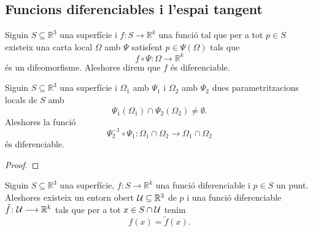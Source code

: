 \documentclass[../Apunts.tex]{subfiles}
\begin{document}
	\subsection{Funcions diferenciables i l'espai tangent}
	\begin{definition}
		\label{def:funció diferenciable}
		Siguin \(S\subseteq\mathbb{R}^{3}\) una superfície i \(f\colon S\longrightarrow\mathbb{R}^{k}\) una funció tal que per a tot \(p\in S\) existeix una carta local \(\Omega\) amb \(\Psi\) satisfent \(p\in\Psi(\Omega)\) tals que
		\[f\circ\Psi\colon\Omega\longrightarrow\mathbb{R}^{k}\]
		és un difeomorfisme. Aleshores direm que \(f\) és diferenciable.
	\end{definition}
	\begin{theorem}
		\label{thm:la composició de parametritzacions locals és una funció diferenciable}
		Siguin \(S\subseteq\mathbb{R}^{3}\) una superfície i \(\Omega_{1}\) amb \(\Psi_{1}\) i \(\Omega_{2}\) amb \(\Psi_{2}\) dues parametritzacions locals de \(S\) amb
		\[\Psi_{1}(\Omega_{1})\cap\Psi_{2}(\Omega_{2})\neq\emptyset.\]
		Aleshores la funció
		\[\Psi_{2}^{-1}\circ\Psi_{1}\colon\Omega_{1}\cap\Omega_{2}\longrightarrow\Omega_{1}\cap\Omega_{2}\]
		és diferenciable.
	\end{theorem}
	\begin{proof}
%		
	\end{proof}
	\begin{proposition}
		\label{prop:per a tot punt i funció diferenciable d'una superfície podem trobar una segona funció diferenciable igual en un entorn del punt}
		Siguin \(S\subseteq\mathbb{R}^{3}\) una superfície, \(f\colon S\longrightarrow\mathbb{R}^{k}\) una funció diferenciable i \(p\in S\) un punt. Aleshores  existeix un entorn obert \(\mathcal{U}\subseteq\mathbb{R}^{3}\) de \(p\) i una funció diferenciable \(\tilde{f}\colon\mathcal{U}\longrightarrow\mathbb{R}^{k}\) tals que per a tot \(x\in S\cap\mathcal{U}\) tenim
		\[f(x)=\tilde{f}(x).\]
	\end{proposition}
\end{document}
